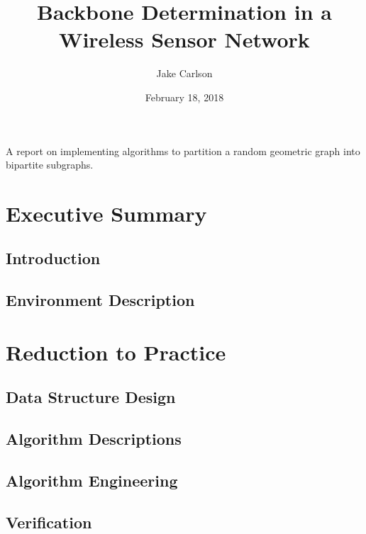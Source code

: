 \documentclass{article}
\begin{document}
\title{Backbone Determination in a Wireless Sensor Network}
\author{Jake Carlson}
\date{February 18, 2018}
\maketitle

\abstract
A report on implementing algorithms to partition a random geometric graph into bipartite subgraphs.
\newpage

\tableofcontents
\newpage

\section{Executive Summary}

    \subsection{Introduction}

    \subsection{Environment Description}

\section{Reduction to Practice}

    \subsection{Data Structure Design}

    \subsection{Algorithm Descriptions}

    \subsection{Algorithm Engineering}

    \subsection{Verification}

\end{document}

